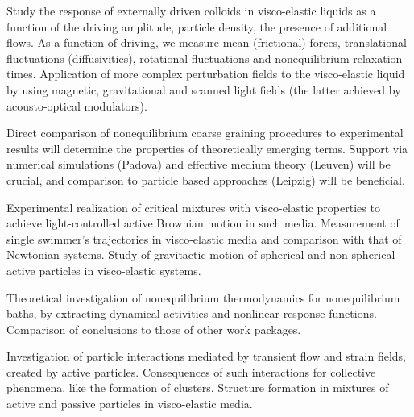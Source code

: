 \begin{workpackage}
\begin{tasklist}
\begin{task}[title=Externally driven particles in visco-elastic baths,id=brown-t2,PM=24,lead=USTUTT,wphases=0-24!0.5]
Study the response of externally driven colloids in visco-elastic liquids as a function of the driving amplitude, particle density, the presence of additional flows. As a function of driving, we
measure mean (frictional) forces, translational fluctuations (diffusivities), rotational
fluctuations and nonequilibrium relaxation times. Application of more complex perturbation fields to the visco-elastic liquid by using magnetic, gravitational and scanned light fields (the latter achieved by acousto-optical modulators).
\end{task}

\begin{task}[title=Theoretical identification of nonequilibrium signatures of the bath,id=brown-t3,PM=24,lead=USTUTT,wphases=0-24!1.0,partners={KUL,UNIPD,ULEI}]
Direct comparison of nonequilibrium coarse graining procedures to experimental results will
determine the properties of theoretically emerging terms. Support via numerical simulations
(Padova) and effective medium theory (Leuven) will be crucial, and comparison to particle
based approaches (Leipzig) will be beneficial.
\end{task}

\begin{task}[title=Self-propelled particles in visco-elastic baths,id=brown-t4,PM=24,lead=USTUTT,wphases=24-48!0.5]
Experimental realization of critical mixtures with visco-elastic properties to achieve light-controlled active Brownian motion in such media. Measurement of single swimmer's trajectories in visco-elastic media and comparison with that of Newtonian systems. Study of gravitactic motion of spherical and non-spherical active particles in visco-elastic systems. 
\end{task}
\begin{task}[title=Nonequilbrium thermodynamics,id=brown-t5,PM=24,lead=USTUTT,wphases=24-48!1.0,partners={KUL,UNIPD,ULEI}]
Theoretical investigation of nonequilibrium thermodynamics for nonequilibrium baths, by
extracting dynamical activities and nonlinear response functions. Comparison of conclusions
to those of other work packages.
\end{task}

\begin{task}[title=Collective behavior of self-propelled particles in visco-elastic baths,id=brown-t6,PM=24,lead=USTUTT,wphases=24-48!0.5]
Investigation of particle interactions mediated by transient flow and strain fields, created by active particles. Consequences of such interactions for collective phenomena, like the formation of clusters. Structure formation in mixtures of active and passive particles in visco-elastic media.  
\end{task}



\end{tasklist}
\end{workpackage}
